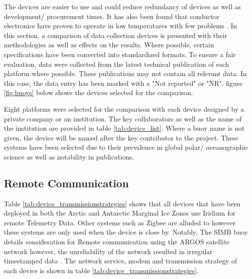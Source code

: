 The devices are easier to use and could reduce redundancy of devices as well as development/ procurement times. It has also been found that conductor electronics have proven to operate in low temperatures with few problems \cite{rabault2017measurements}. In this section, a comparison of data collection devices is presented with their methodologies as well as effects on the results. Where possible, certain specifications have been converted into standardized formats. To ensure a fair evaluation, data were collected from the latest technical publication of each platform where possible. These publications may not contain all relevant data. In this case, the data entry has been marked with a "Not reported" or "NR". figure \ref{fig:buoys} below shows the devices selected for the comparison.


Eight platforms were selected for the comparison with each device designed by a private company or an institution. The key collaborators as well as the name of the institution are provided in table \ref{tab:device_list}. Where a buoy name is not given, the device will be named after the key contributor to the project. These systems have been selected due to their prevalence in global polar/ oceanographic science as well as notability in publications.

\subsection{Remote Communication}

Table \ref{tab:device_transmissionstrategies} shows that all devices that have been deployed in both the Arctic and Antarctic Marginal Ice Zones use Iridium for remote Telemetry Data.  Other systems such as Zigbee \cite{guimaraes2018surface} are alluded to however these systems are only used when the device is close by. Notably, The SIMB buoy details consideration for Remote communication using the ARGOS satellite network however, the unreliability of the network resulted in irregular timestamped data \cite{planck2019evolution}. The network service, modem and transmission strategy of each device is shown in table \ref{tab:device_transmissionstrategies}.

